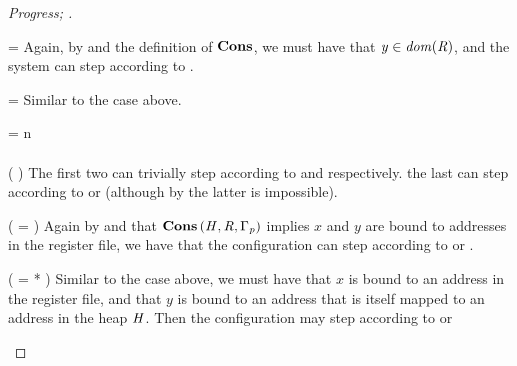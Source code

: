 \begin{proof}[Progress; ]
  \begin{eqncase}{  \ottsym{=}   \LET  {}  =    \IN  {} }
    Again, by  and the definition
    of $\mathbf{Cons}$, we must have that $ \mathit{y}  \in   \mathit{dom}( \mathit{R} )  $, and the system can step
    according to .
  \end{eqncase}

  \begin{eqncase}{  \ottsym{=}   \LET  {}  =   \MKREF  {}   \IN  {} }
    Similar to the  case above.
  \end{eqncase}

  \begin{eqncase}{
        \ottsym{=}   \LET  {}  =  n  \IN  {}  \\
         \ottsym{=}    \SEQ  {}  \\
        \ottsym{=}   \ASSERT( \varphi ) \SEQ  {} 
    }
    The first two can trivially step according to  and  respectively.
    the last can step according to  or  (although
    by  the latter is impossible).
  \end{eqncase}
  
  \begin{eqncase}{
        \ottsym{=}   \ALIAS(   =   ) \SEQ  {} 
    }
    Again by  and that
    $\mathbf{Cons} \, (  \mathit{H}  ,  \mathit{R}  ,  \Gamma_{\mathit{p}}  )$ implies $\mathit{x}$ and $\mathit{y}$ are bound to addresses
    in the register file, we have that the configuration can step according to 
    or .
  \end{eqncase}

  \begin{eqncase}{
        \ottsym{=}   \ALIAS(   = *   ) \SEQ  {}  
    }
    Similar to the case above, we must have that $\mathit{x}$ is bound to an address
    in the register file, and that $\mathit{y}$ is bound to an address that
    is itself mapped to an address in the heap $\mathit{H}$. Then the configuration may
    step according to  or 
  \end{eqncase}


\end{proof}
